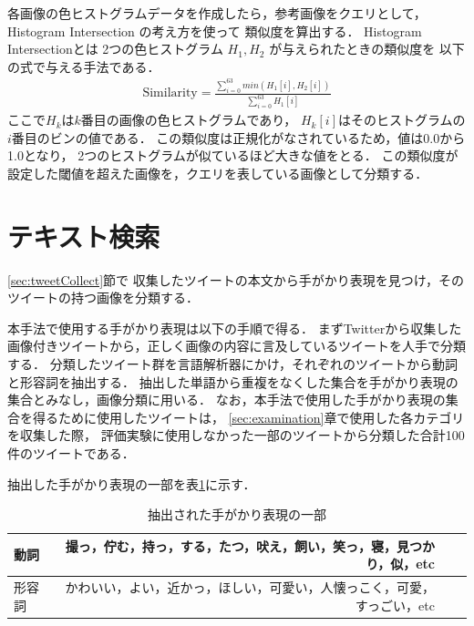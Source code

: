 各画像の色ヒストグラムデータを作成したら，参考画像をクエリとして，
Histogram Intersection
の考え方を使って
類似度を算出する．
Histogram Intersectionとは
2つの色ヒストグラム
$H_1,H_2$
が与えられたときの類似度を
以下の式で与える手法である．
%
\begin{eqnarray}
\mbox{Similarity} = \frac{\sum_{i=0}^{63} min(H_1[i],H_2[i])}{\sum_{i=0}^{63} H_1[i]}
\end{eqnarray}
%
ここで$H_k$は$k$番目の画像の色ヒストグラムであり，
$H_k[i]$はそのヒストグラムの$i$番目のビンの値である．
この類似度は正規化がなされているため，値は0.0から1.0となり，
2つのヒストグラムが似ているほど大きな値をとる．
この類似度が設定した閾値を超えた画像を，クエリを表している画像として分類する．



\section{テキスト検索}
\label{sec:textSearch}
\ref{sec:tweetCollect}節で
収集したツイートの本文から手がかり表現を見つけ，そのツイートの持つ画像を分類する．

本手法で使用する手がかり表現は以下の手順で得る．
まずTwitterから収集した画像付きツイートから，正しく画像の内容に言及しているツイートを人手で分類する．
分類したツイート群を言語解析器にかけ，それぞれのツイートから動詞と形容詞を抽出する．
抽出した単語から重複をなくした集合を手がかり表現の集合とみなし，画像分類に用いる．
なお，本手法で使用した手がかり表現の集合を得るために使用したツイートは，
\ref{sec:examination}章で使用した各カテゴリを収集した際，
評価実験に使用しなかった一部のツイートから分類した合計100件のツイートである．

抽出した手がかり表現の一部を表\ref{tab:predicate}に示す．

\begin{table}[tb]
\begin{center}
\caption{抽出された手がかり表現の一部}
\label{tab:predicate}
\begin{tabular}{|l|r|r|r|}\hline
動詞& 撮っ，佇む，持っ，する，たつ，吠え，飼い，笑っ，寝，見つかり，似，etc \\ \hline
形容詞& かわいい，よい，近かっ，ほしい，可愛い，人懐っこく，可愛，すっごい，etc \\ \hline
\end{tabular}
\end{center}
\end{table}


